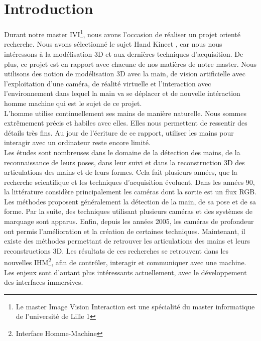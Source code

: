 \chapter*{Introduction}

Durant notre master IVI\footnote{Le master Image Vision Interaction est 
une spécialité du master informatique de l'université de Lille 1}, 
nous avons l'occasion de réaliser un projet orienté recherche. Nous avons 
sélectionné le sujet \og Hand Kinect \fg, car nous nous intéressons à la 
modélisation 3D et aux dernières techniques d'acquisition.
De plus, ce projet est en rapport avec chacune de nos matières de
notre master. Nous utilisons des notion de modélisation 3D avec la main, de vision artificielle avec l'exploitation d'une caméra, de réalité virtuelle et l'interaction avec l'environnement dans lequel la main va se déplacer et de nouvelle intéraction
homme machine qui est le sujet de ce projet.\\

L'homme utilise continuellement ses mains de manière naturelle. Nous 
sommes extrêmement précis et habiles avec elles. Elles nous permettent 
de ressentir des détails très fins. Au jour de l'écriture de ce rapport, 
utiliser les mains pour interagir avec un ordinateur reste encore limité.\\

Les études sont nombreuses dans le domaine de la détection des mains, 
de la reconnaissance de leurs poses, dans leur suivi et dans la reconstruction 
3D des articulations des mains et de leurs formes. Cela fait plusieurs 
années, que la recherche scientifique et les techniques d'acquisition 
évoluent. Dans les années 90, la littérature considère principalement les 
caméras dont la sortie est un flux RGB. Les méthodes proposent généralement la 
détection de la main, de sa pose et de sa forme. Par la suite, des techniques 
utilisant plusieurs caméras et des systèmes de marquage sont apparus. 
Enfin, depuis les années 2005, les caméras de profondeur ont permis 
l'amélioration et la création de certaines techniques. Maintenant, il 
existe des méthodes permettant de retrouver les articulations des mains 
et leurs reconstructions 3D. Les résultats de ces recherches se 
retrouvent dans les nouvelles IHM\footnote{Interface Homme-Machine}, 
afin de contrôler, interagir et communiquer avec une machine. Les enjeux 
sont d'autant plus intéressants actuellement, avec le développement des 
interfaces immersives.\\

